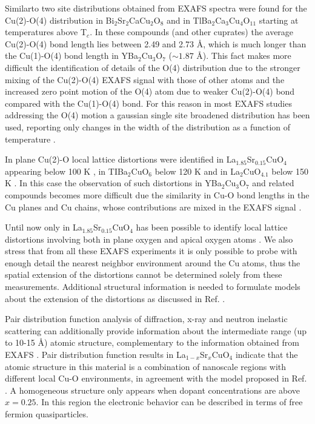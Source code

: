 Similarto two site distributions obtained from EXAFS spectra were found for the Cu(2)-O(4) distribution in Bi$_{2}$Sr$_{2}$CaCu$_{2}$O$_{8}$ \cite{bianconni1992lattice} and in TlBa$_{2}$Ca$_{3}$Cu$_{4}$O$_{11}$ \cite{Allen1991} starting at temperatures above T$_{c}$. 
In these compounds (and other cuprates) the average Cu(2)-O(4) bond length lies between 2.49 and 2.73 \AA, which is much longer than the Cu(1)-O(4) bond length in YBa$_{2}$Cu$_{3}$O$_{7}$ ($\sim 1.87$ \AA). 
This fact makes more difficult the identification of details of the O(4) distribution due to the stronger mixing of the Cu(2)-O(4) EXAFS signal with those of other atoms and the increased zero point motion of the O(4) atom due to weaker Cu(2)-O(4) bond compared with the Cu(1)-O(4) bond.
For this reason in most EXAFS studies addressing the O(4) motion a gaussian single site broadened distribution has been used, reporting only changes in the width of the distribution as a function of temperature \cite{Booth1995,Oyanagi2007,Zhang2009}.

In plane Cu(2)-O local lattice distortions were identified in La$_{1.85}$Sr$_{0.15}$CuO$_{4}$ appearing below 100 K \cite{Bianconi1996,Oyanagi2007}, in TIBa$_{2}$CuO$_{6}$ below 120 K \cite{Conradson1997} and in La$_{2}$CuO$_{4.1}$ below 150 K \cite{Lanzara1997,MustredeLeon:xj5003}. 
In this case the observation of such distortions in YBa$_{2}$Cu$_{3}$O$_{7}$ and related compounds becomes more difficult due the similarity in Cu-O bond lengths in the Cu planes and Cu chains, whose contributions are mixed in the EXAFS signal \cite{Conradson1997,MustredeLeon1992a}.

Until now only in La$_{1.85}$Sr$_{0.15}$CuO$_{4}$ has been possible to identify local lattice distortions involving both in plane oxygen and apical oxygen atoms  \cite{Bianconi1996}. 
We also stress that from all these EXAFS experiments it is only possible to probe with enough detail the nearest neighbor environment around the Cu atoms, thus the spatial extension of the distortions cannot be determined solely from these measurements. 
Additional structural information \cite{Bianconi1996a} is needed to formulate models about the extension of the distortions as discussed in Ref. \cite{Bianconi1996}.

Pair distribution function analysis of diffraction, x-ray and neutron inelastic scattering can additionally provide information about the intermediate range (up to 10-15 \AA) atomic structure, complementary to the information obtained from EXAFS \cite{Egami2003}. 
Pair distribution function results in La$_{1-x}$Sr$_{x}$CuO$_{4}$ \cite{Bozin1999,Bozin2000} indicate that the atomic structure in this material is a combination of nanoscale regions with different local Cu-O environments, in agreement with the model proposed in Ref. \cite{Bianconi1996}. 
A homogeneous structure only appears when dopant concentrations are above $x = 0.25$. 
In this region the electronic behavior can be described in terms of free fermion quasiparticles.

